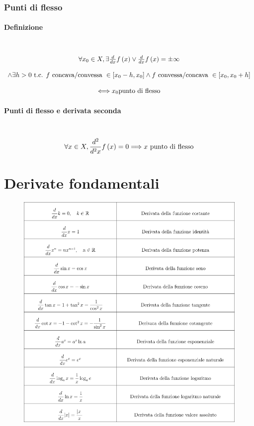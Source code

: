 \documentclass{report}
\newcommand{\subsubsubsection}[1]{\paragraph{#1}\mbox{}\\}
\begin{document}
        \subsubsection{Punti di flesso}
            \subsubsubsection{Definizione}
                $$\begin{array}{c}\forall x_0 \in X, \exists \D{x}f\left(x\right) \vee \D{x}f\left(x\right) = \pm \infty \\ \\
                    \wedge \exists h > 0 \textrm{ t.c. } f \textrm{ concava/convessa } \in \left[x_0 - h, x_0\right] 
                    \wedge f \textrm{ convessa/concava } \in \left[x_0, x_0 + h\right] \\ \\
                    \Longleftrightarrow x_0 \textrm{punto di flesso}
                \end{array}$$
            \subsubsubsection{Punti di flesso e derivata seconda}
                $$\forall x \in X, \D{x}{2}f\left(x\right) = 0 \Longrightarrow x \textrm{ punto di flesso}$$ 
\newpage
\section{Derivate fondamentali}
    \begin{center}
        \begin{figure}[H]
            \includegraphics[width = \textwidth]{derivate.png}
        \end{figure}
    \end{center}
\newpage
\end{document}
